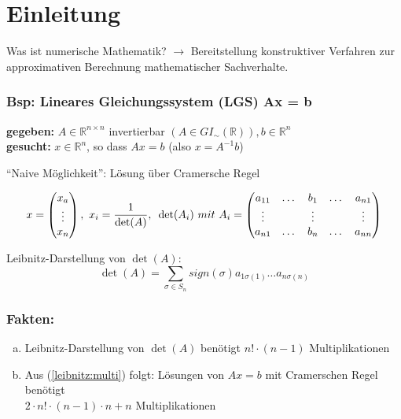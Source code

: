 \section{Einleitung}
Was ist numerische Mathematik?
$\rightarrow$ Bereitstellung konstruktiver Verfahren zur 
approximativen Berechnung mathematischer Sachverhalte.

\subsubsection*{Bsp: Lineares Gleichungssystem (LGS) Ax = b}
\textbf{gegeben:} $A \in \mathbb{R}^{n \times n}$ invertierbar 
$(A \in GI_{\sim} (\mathbb{R})), b \in \mathbb{R}^n$ \\
\textbf{gesucht:} $x \in \mathbb{R}^n$, so dass $Ax = b$ (also $x = A^{-1} b$)

"`Naive Möglichkeit"': Lösung über Cramersche Regel

\begin{displaymath}
x = \begin{pmatrix} x_a \\ \vdots \\ x_n \end{pmatrix}, 
~ x_i = \frac{1}{\det (A)},\\~ \det(A_i)~ mit~ 
A_i = \begin{pmatrix} a_{11} & \dots & b_1 & \dots & a_{n1} 
\\ \vdots & & \vdots & & \vdots \\ a_{n1} & \dots & b_n & 
\dots & a_{nn} \end{pmatrix}
\end{displaymath}

Leibnitz-Darstellung von $\det(A)$:
\begin{displaymath}
\det(A) = \sum_{\sigma \in S_n} sign (\sigma) a_{1\sigma(1)} 
\dots a_{n\sigma(n)}
\end{displaymath}

\subsubsection*{Fakten:}
\begin{enumerate}[(a)]
\item\label{leibnitz:multi}
Leibnitz-Darstellung von $\det(A)$ benötigt $n! \cdot (n-1)$ Multiplikationen
\item
Aus (\ref{leibnitz:multi}) folgt: Lösungen von $Ax=b$ mit Cramerschen Regel benötigt \\
$2 \cdot  n!\cdot(n-1) \cdot n + n$ Multiplikationen 
\end{enumerate}


